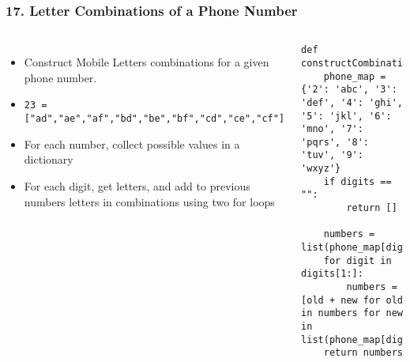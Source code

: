 \begin{frame}[fragile]\frametitle{17. Letter Combinations of a Phone Number}

	\begin{columns}[T]
	\begin{itemize}
	\item Construct Mobile Letters combinations for a given phone number.
	\item \lstinline{23 = ["ad","ae","af","bd","be","bf","cd","ce","cf"]}
	\item For each number, collect possible values in a dictionary
	\item For each digit, get letters, and add to previous numbers letters in combinations using two for loops
	\end{itemize}
		\begin{lstlisting}[basicstyle=\scriptsize]
def constructCombinations(digits):
    phone_map = {'2': 'abc', '3': 'def', '4': 'ghi', '5': 'jkl', '6': 'mno', '7': 'pqrs', '8': 'tuv', '9': 'wxyz'}
    if digits == "":
        return []

    numbers = list(phone_map[digits[0]])
    for digit in digits[1:]:
        numbers = [old + new for old in numbers for new in list(phone_map[digit])]
    return numbers
				\end{lstlisting}		

	\end{columns}
		
\end{frame}

